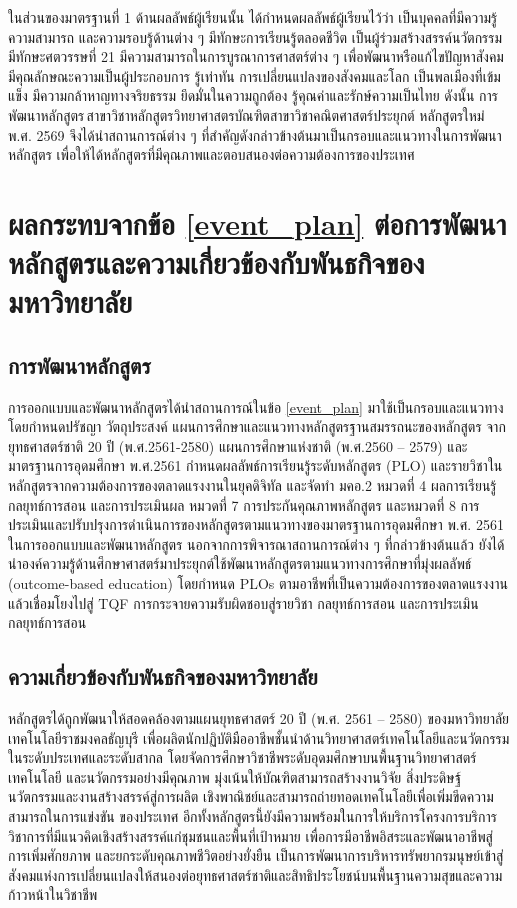 {ในส่วนของมาตรฐานที่ 1 ด้านผลลัพธ์ผู้เรียนนั้น ได้กำหนดผลลัพธ์ผู้เรียนไว้ว่า        เป็นบุคคลที่มีความรู้ ความสามารถ และความรอบรู้ด้านต่าง ๆ มีทักษะการเรียนรู้ตลอดชีวิต เป็นผู้ร่วมสร้างสรรค์นวัตกรรม มีทักษะศตวรรษที่ 21 มีความสามารถในการบูรณาการศาสตร์ต่าง ๆ เพื่อพัฒนาหรือแก้ไขปัญหาสังคม มีคุณลักษณะความเป็นผู้ประกอบการ รู้เท่าทัน     การเปลี่ยนแปลงของสังคมและโลก เป็นพลเมืองที่เข้มแข็ง มีความกล้าหาญทางจริยธรรม    ยึดมั่นในความถูกต้อง รู้คุณค่าและรักษ์ความเป็นไทย
ดังนั้น การพัฒนาหลักสูตร\thdegree\,สาขาวิชา\thdegreebranch หลักสูตรวิทยาศาสตรบัณฑิตสาขาวิชาคณิตศาสตร์ประยุกต์ หลักสูตรใหม่ พ.ศ. 2569 จึงได้นำสถานการณ์ต่าง ๆ ที่สำคัญดังกล่าวข้างต้นมาเป็นกรอบและแนวทางในการพัฒนาหลักสูตร เพื่อให้ได้หลักสูตรที่มีคุณภาพและตอบสนองต่อความต้องการของประเทศ
\section{ผลกระทบจากข้อ \ref{event_plan} ต่อการพัฒนาหลักสูตรและความเกี่ยวข้องกับพันธกิจของมหาวิทยาลัย}
\subsection{การพัฒนาหลักสูตร}
การออกแบบและพัฒนาหลักสูตรได้นำสถานการณ์ในข้อ \ref{event_plan} มาใช้เป็นกรอบและแนวทาง โดยกำหนดปรัชญา วัตถุประสงค์ แผนการศึกษาและแนวทางหลักสูตรฐานสมรรถนะของหลักสูตร จากยุทธศาสตร์ชาติ 20 ปี (พ.ศ.2561-2580) แผนการศึกษาแห่งชาติ        (พ.ศ.2560 – 2579) และมาตรฐานการอุดมศึกษา พ.ศ.2561 กำหนดผลลัพธ์การเรียนรู้ระดับหลักสูตร (PLO) และรายวิชาในหลักสูตรจากความต้องการของตลาดแรงงานในยุคดิจิทัล และจัดทำ มคอ.2 หมวดที่ 4 ผลการเรียนรู้ กลยุทธ์การสอน และการประเมินผล หมวดที่ 7 การประกันคุณภาพหลักสูตร และหมวดที่ 8 การประเมินและปรับปรุงการดำเนินการของหลักสูตรตามแนวทางของมาตรฐานการอุดมศึกษา พ.ศ. 2561
ในการออกแบบและพัฒนาหลักสูตร นอกจากการพิจารณาสถานการณ์ต่าง ๆ ที่กล่าวข้างต้นแล้ว ยังได้นำองค์ความรู้ด้านศึกษาศาสตร์มาประยุกต์ใช้พัฒนาหลักสูตรตามแนวทางการศึกษาที่มุ่งผลลัพธ์ (outcome-based education) โดยกำหนด PLOs ตามอาชีพที่เป็นความต้องการของตลาดแรงงาน แล้วเชื่อมโยงไปสู่ TQF การกระจายความรับผิดชอบสู่รายวิชา กลยุทธ์การสอน และการประเมินกลยุทธ์การสอน 
\subsection{ความเกี่ยวข้องกับพันธกิจของมหาวิทยาลัย}
หลักสูตรได้ถูกพัฒนาให้สอดคล้องตามแผนยุทธศาสตร์ 20 ปี (พ.ศ. 2561 – 2580) ของมหาวิทยาลัยเทคโนโลยีราชมงคลธัญบุรี เพื่อผลิตนักปฏิบัติมืออาชีพชั้นนำด้านวิทยาศาสตร์เทคโนโลยีและนวัตกรรมในระดับประเทศและระดับสากล โดยจัดการศึกษาวิชาชีพระดับอุดมศึกษาบนพื้นฐานวิทยาศาสตร์เทคโนโลยี และนวัตกรรมอย่างมีคุณภาพ มุ่งเน้นให้บัณฑิตสามารถสร้างงานวิจัย สิ่งประดิษฐ์ นวัตกรรมและงานสร้างสรรค์สู่การผลิต เชิงพาณิชย์และสามารถถ่ายทอดเทคโนโลยีเพื่อเพิ่มขีดความสามารถในการแข่งขัน           ของประเทศ อีกทั้งหลักสูตรนี้ยังมีความพร้อมในการให้บริการโครงการบริการวิชาการที่มีแนวคิดเชิงสร้างสรรค์แก่ชุมชนและพื้นที่เป้าหมาย เพื่อการมีอาชีพอิสระและพัฒนาอาชีพสู่ การเพิ่มศักยภาพ และยกระดับคุณภาพชีวิตอย่างยั่งยืน เป็นการพัฒนาการบริหารทรัพยากรมนุษย์เข้าสู่สังคมแห่งการเปลี่ยนแปลงให้สนองต่อยุทธศาสตร์ชาติและสิทธิประโยชน์บนพื้นฐานความสุขและความก้าวหน้าในวิชาชีพ
}
